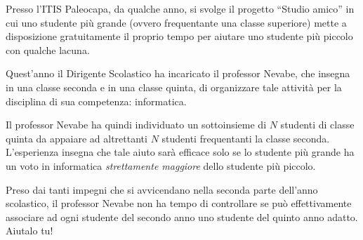 \usepackage{xcolor}
\usepackage{afterpage}
\usepackage{pifont,mdframed}
\usepackage[bottom]{footmisc}



\newcommand{\inputfile}{\texttt{input.txt}}
\newcommand{\outputfile}{\texttt{output.txt}}

\newenvironment{warning}
  {\par\begin{mdframed}[linewidth=2pt,linecolor=gray]%
    \begin{list}{}{\leftmargin=1cm
                   \labelwidth=\leftmargin}\item[\Large\ding{43}]}
  {\end{list}\end{mdframed}\par}

\newcommand{\funcitem}[2]{\item[$\blacksquare$] \textbf{\large \textsf{Funzione} \texttt{#1}} \vspace{-0.3cm} \begin{center}\begin{tabularx}{\textwidth}{|c|X|} \hline #2 \hline \end{tabularx}\end{center}}


        Presso l'ITIS Paleocapa, da qualche anno, si svolge il progetto ``Studio amico'' in cui uno studente più grande (ovvero frequentante una classe superiore) mette a disposizione gratuitamente il proprio tempo per aiutare uno studente più piccolo con qualche lacuna.

        Quest'anno il Dirigente Scolastico ha incaricato il professor Nevabe, che insegna in una classe seconda e in una classe quinta, di organizzare tale attività per la disciplina di sua competenza: informatica.

        Il professor Nevabe ha quindi individuato un sottoinsieme di $N$ studenti di classe quinta da appaiare ad altrettanti $N$ studenti frequentanti la classe seconda. L'esperienza insegna che tale aiuto sarà efficace solo se lo studente più grande ha un voto in informatica \emph{strettamente maggiore} dello studente più piccolo.

        Preso dai tanti impegni che si avvicendano nella seconda parte dell'anno scolastico, il professor Nevabe non ha tempo di controllare se può effettivamente associare ad ogni studente del secondo anno uno studente del quinto anno adatto. Aiutalo tu! 

